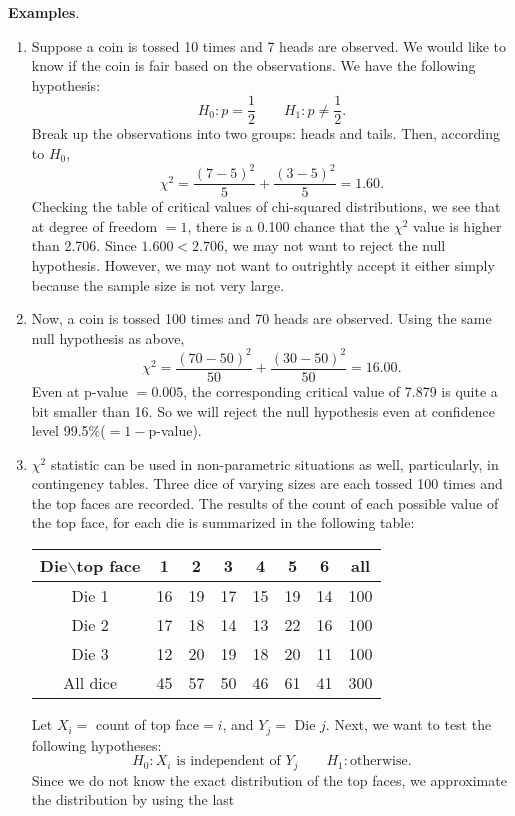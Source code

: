 \documentclass[12pt]{article}
\begin{document}
\textbf{Examples}.
\begin{enumerate}
\item Suppose a coin is tossed 10 times and  7 heads are observed.
 We would like to know if the coin is fair based on the
 observations.  We have the following hypothesis:
 $$H_0: p=\frac{1}{2}\qquad H_1:p\neq\frac{1}{2}.$$
 Break up the observations into two groups: heads and tails.  Then,
 according to $H_0$,
 $$\chi^2=\frac{(7-5)^2}{5}+\frac{(3-5)^2}{5}=1.60.$$
 Checking the table of critical values of chi-squared distributions,
 we see that at degree of freedom $=1$, there is a 0.100 chance that the
 $\chi^2$ value is higher than 2.706.  Since $1.600<2.706$, we may
 not want to reject the null hypothesis.  However, we may not want
 to outrightly accept it either simply because the sample size is not very
 large.
\item Now, a coin is tossed 100 times and 70 heads are observed.
Using the same null hypothesis as above,
 $$\chi^2=\frac{(70-50)^2}{50}+\frac{(30-50)^2}{50}=16.00.$$
 Even at p-value $=0.005$, the corresponding critical value of 7.879
 is quite a bit smaller than 16.  So we will reject the null
 hypothesis even at confidence level 99.5\%($=1-$p-value).
\item $\chi^2$ statistic can be used in non-parametric situations as
well, particularly, in contingency tables.  Three dice of varying
sizes are each tossed 100 times and the top faces are recorded.  The
results of the count of each possible value of the top face, for
each die is summarized in the following table:
\begin{center}
\begin{tabular}{|c|c|c|c|c|c|c|c|}
\hline
Die$\backslash$top face & 1 & 2 & 3 & 4 & 5 & 6 & all\\
\hline
Die 1 & 16 & 19 & 17 & 15 & 19 & 14 & 100 \\
\hline
Die 2 & 17 & 18 & 14 & 13 & 22 & 16 & 100 \\
\hline
Die 3 & 12 & 20 & 19 & 18 & 20 & 11 & 100 \\
\hline
All dice & 45 & 57 & 50 & 46 & 61 & 41 & 300 \\
\hline
\end{tabular}
\end{center}
Let $X_i=$ count of top face$=i$, and $Y_j=$ Die $j$.  Next, we
want to test the following hypotheses:
 $$H_0: X_i\mbox{ is independent of } Y_j\qquad
 H_1:\mbox{otherwise}.$$  Since we do not know the exact distribution of
 the top faces, we approximate the distribution by using the last

\end{enumerate}
\end{document}
